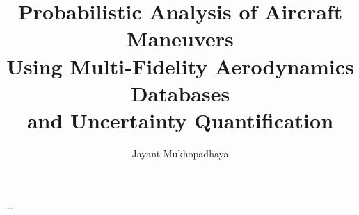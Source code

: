 \documentclass{report}
\begin{document}
\title{Probabilistic Analysis of Aircraft Maneuvers \\
            Using Multi-Fidelity Aerodynamics Databases \\
            and Uncertainty Quantification}
\author{Jayant Mukhopadhaya}
 
\beforepreface
% 

\afterpreface

% 

% 

% 

% 



% 


...


\end{document}
